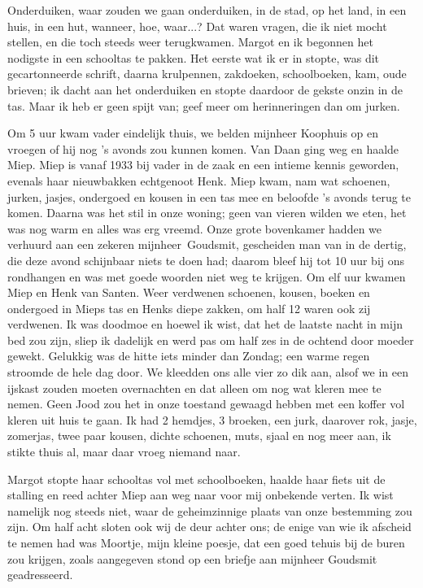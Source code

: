 \documentclass{book}
\begin{document}
Onderduiken, waar zouden we gaan onderduiken, in de stad, op het land, in een
huis, in een hut, wanneer, hoe, waar...? Dat waren vragen, die ik niet mocht
stellen, en die toch steeds weer terugkwamen. Margot en ik begonnen het nodigste
in een schooltas te pakken. Het eerste wat ik er in stopte, was dit
gecartonneerde schrift, daarna krulpennen, zakdoeken, schoolboeken, kam, oude
brieven; ik dacht aan het onderduiken en stopte daardoor de gekste onzin in de
tas. Maar ik heb er geen spijt van; geef meer om herinneringen dan om jurken.

Om 5 uur kwam vader eindelijk thuis, we belden mijnheer Koophuis op en vroegen
of hij nog 's avonds zou kunnen komen. Van Daan ging weg en haalde Miep. Miep is
vanaf 1933 bij vader in de zaak en een intieme kennis geworden, evenals haar
nieuwbakken echtgenoot Henk. Miep kwam, nam wat schoenen, jurken, jasjes,
ondergoed en kousen in een tas mee en beloofde 's avonds terug te komen. Daarna
was het stil in onze woning; geen van vieren wilden we eten, het was nog warm en
alles was erg vreemd. Onze grote bovenkamer hadden we verhuurd aan een zekeren
mijnheer~Goudsmit, gescheiden man van in de dertig, die deze avond schijnbaar
niets te doen had; daarom bleef hij tot 10 uur bij ons rondhangen en was met
goede woorden niet weg te krijgen. Om elf uur kwamen Miep en Henk van Santen.
Weer verdwenen schoenen, kousen, boeken en ondergoed in Mieps tas en Henks diepe
zakken, om half 12 waren ook zij verdwenen. Ik was doodmoe en hoewel ik wist,
dat het de laatste nacht in mijn bed zou zijn, sliep ik dadelijk en werd pas om
half zes in de ochtend door moeder gewekt. Gelukkig was de hitte iets minder dan
Zondag; een warme regen stroomde de hele dag door. We kleedden ons alle vier zo
dik aan, alsof we in een ijskast zouden moeten overnachten en dat alleen om nog
wat kleren mee te nemen. Geen Jood zou het in onze toestand gewaagd hebben met
een koffer vol kleren uit huis te gaan. Ik had 2 hemdjes, 3 broeken, een jurk,
daarover rok, jasje, zomerjas, twee paar kousen, dichte schoenen, muts, sjaal en
nog meer aan, ik stikte thuis al, maar daar vroeg niemand naar.

Margot stopte haar schooltas vol met schoolboeken, haalde haar fiets uit de
stalling en reed achter Miep aan weg naar voor mij onbekende verten.  Ik wist
namelijk nog steeds niet, waar de geheimzinnige plaats van onze bestemming zou
zijn. Om half acht sloten ook wij de deur achter ons; de enige van wie ik
afscheid te nemen had was Moortje, mijn kleine poesje, dat een goed tehuis bij
de buren zou krijgen, zoals aangegeven stond op een briefje aan mijnheer
Goudsmit geadresseerd.
\end{document}
